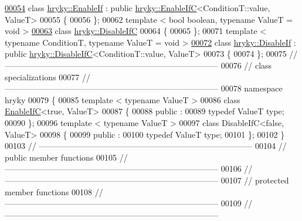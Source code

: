 \begin{DoxyCode}
\hypertarget{enable__if_8h_source_l00054}{}\hyperlink{classhryky_1_1_enable_if}{00054} \textcolor{keyword}{class }\hyperlink{classhryky_1_1_enable_if}{hryky::EnableIf} : \textcolor{keyword}{public} \hyperlink{classhryky_1_1_enable_if_c}{hryky::EnableIfC}<ConditionT::value, ValueT>
00055 \{
00056 \};
00062 \textcolor{keyword}{template} < \textcolor{keywordtype}{bool} \textcolor{keywordtype}{boolean}, \textcolor{keyword}{typename} ValueT = \textcolor{keywordtype}{void} >
\hypertarget{enable__if_8h_source_l00063}{}\hyperlink{classhryky_1_1_disable_if_c}{00063} \textcolor{keyword}{class }\hyperlink{classhryky_1_1_disable_if_c}{hryky::DisableIfC}
00064 \{
00065 \};
00071 \textcolor{keyword}{template} < \textcolor{keyword}{typename} ConditionT, \textcolor{keyword}{typename} ValueT = \textcolor{keywordtype}{void} >
\hypertarget{enable__if_8h_source_l00072}{}\hyperlink{classhryky_1_1_disable_if}{00072} \textcolor{keyword}{class }\hyperlink{classhryky_1_1_disable_if}{hryky::DisableIf} : \textcolor{keyword}{public} \hyperlink{classhryky_1_1_disable_if_c}{hryky::DisableIfC}<ConditionT::value, ValueT>
00073 \{
00074 \};
00075 \textcolor{comment}{//
      ------------------------------------------------------------------------------}
00076 \textcolor{comment}{// class specializations}
00077 \textcolor{comment}{//
      ------------------------------------------------------------------------------}
00078 \textcolor{keyword}{namespace }hryky
00079 \{
00085 \textcolor{keyword}{template} < \textcolor{keyword}{typename} ValueT >
00086 \textcolor{keyword}{class }\hyperlink{classhryky_1_1_enable_if_c}{EnableIfC}<true, ValueT>
00087 \{
00088 \textcolor{keyword}{public} :
00089     \textcolor{keyword}{typedef} ValueT  type;
00090 \};
00096 \textcolor{keyword}{template} < \textcolor{keyword}{typename} ValueT >
00097 \textcolor{keyword}{class }DisableIfC<false, ValueT>
00098 \{
00099 \textcolor{keyword}{public} :
00100     \textcolor{keyword}{typedef} ValueT  type;
00101 \};
00102 \}
00103 \textcolor{comment}{//
      ------------------------------------------------------------------------------}
00104 \textcolor{comment}{// public member functions}
00105 \textcolor{comment}{//
      ------------------------------------------------------------------------------}
00106 \textcolor{comment}{//
      ------------------------------------------------------------------------------}
00107 \textcolor{comment}{// protected member functions}
00108 \textcolor{comment}{//
      ------------------------------------------------------------------------------}
00109 \textcolor{comment}{//
      ------------------------------------------------------------------------------}

\end{DoxyCode}

